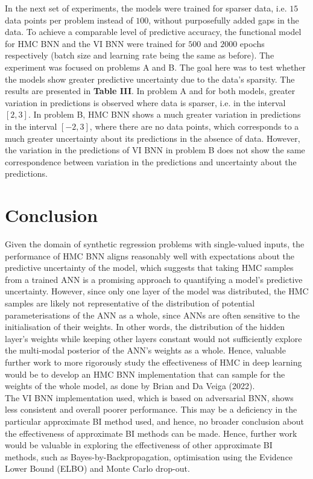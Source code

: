 \documentclass[conference]{IEEEtran}
\begin{document}
In the next set of experiments, the models were trained for sparser data, i.e. $15$ data points per problem instead of $100$, without purposefully added gaps in the data. To achieve a comparable level of predictive accuracy, the functional model for HMC BNN and the VI BNN were trained for $500$ and $2000$ epochs respectively (batch size and learning rate being the same as before). The experiment was focused on problems A and B. The goal here was to test whether the models show greater predictive uncertainty due to the data's sparsity. The results are presented in \textbf{Table III}. In problem A and for both models, greater variation in predictions is observed where data is sparser, i.e. in the interval $[2, 3]$. In problem B, HMC BNN shows a much greater variation in predictions in the interval $[-2, 3]$, where there are no data points, which corresponds to a much greater uncertainty about its predictions in the absence of data. However, the variation in the predictions of VI BNN in problem B does not show the same correspondence between variation in the predictions and uncertainty about the predictions.

\section{Conclusion}
Given the domain of  synthetic regression problems with single-valued inputs, the performance of HMC BNN aligns reasonably well with expectations about the predictive uncertainty of the model, which suggests that taking HMC samples from a trained ANN is a promising approach to quantifying a model's predictive uncertainty. However, since only one layer of the model was distributed, the HMC samples are likely not representative of the distribution of potential parameterisations of the ANN as a whole, since ANNs are often sensitive to the initialisation of their weights. In other words, the distribution of the hidden layer's weights while keeping other layers constant would not sufficiently explore the multi-modal posterior of the ANN's weights as a whole. Hence, valuable further work to more rigorously study the effectiveness of HMC in deep learning would be to develop an HMC BNN implementation that can sample for the weights of the whole model, as done by Brian and Da Veiga (2022).\\

The VI BNN implementation used, which is based on adversarial BNN, shows less consistent and overall poorer performance. This may be a deficiency in the particular approximate BI method used, and hence, no broader conclusion about the effectiveness of approximate BI methods can be made. Hence, further work would be valuable in exploring the effectiveness of other approximate BI methods, such as Bayes-by-Backpropagation, optimisation using the Evidence Lower Bound (ELBO) and Monte Carlo drop-out.
\end{document}
